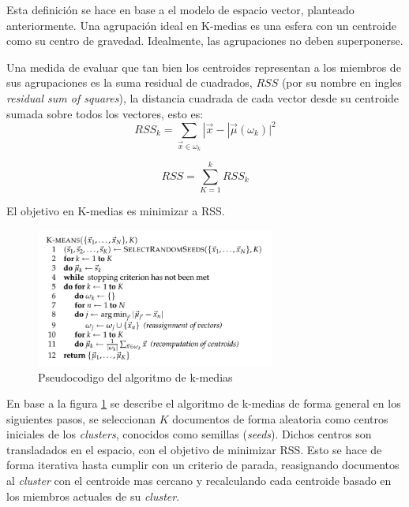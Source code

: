     Esta definición se hace en base a el modelo de espacio vector, planteado anteriormente. Una agrupación ideal en K-medias es una esfera con un centroide como su centro de gravedad. Idealmente, las agrupaciones no deben superponerse.\cite{informationretrieval}

    Una medida de evaluar que tan bien los centroides representan a los miembros de sus agrupaciones es la suma residual de cuadrados, $RSS$ (por su nombre en ingles \textit{residual sum of squares}), la distancia cuadrada de cada vector desde su centroide sumada sobre todos los vectores, esto es:
    \begin{equation} \label{eq:RSSk} 
RSS_k=\sum_{\vec{x}\in\omega_k}|\vec{x}-|\vec{\mu}(\omega_k)|^2
\end{equation}


    \begin{equation} \label{eq:RSS} 
RSS=\sum_{K=1}^k{RSS_k}
\end{equation}

    El objetivo en K-medias es minimizar a RSS.

    \begin{figure}[!htbp]
      \centering
      \includegraphics[width=0.7\textwidth]{Figuras/codigo_kmedias.png}
      \caption{Pseudocodigo del algoritmo de k-medias}
      \label{fig:cod_kmedias}
   \end{figure}

    
    En base a la figura \ref{fig:cod_kmedias} se describe el algoritmo de k-medias de forma general en los siguientes pasos, se seleccionan $K$ documentos de forma aleatoria como centros iniciales de los \textit{clusters}, conocidos como semillas (\textit{seeds}). Dichos centros son transladados en el espacio, con el objetivo de minimizar RSS. Esto se hace de forma iterativa hasta cumplir con un criterio de parada, reasignando documentos al \textit{cluster} con el centroide mas cercano y recalculando cada centroide basado en los miembros actuales de su \textit{cluster}.\cite{informationretrieval}
    
